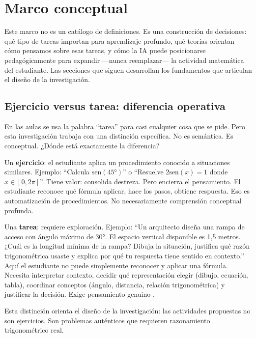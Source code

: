 \section{Marco conceptual}

Este marco no es un catálogo de definiciones. Es una construcción de decisiones: qué tipo de tareas importan para aprendizaje profundo, qué teorías orientan cómo pensamos sobre esas tareas, y cómo la IA puede posicionarse pedagógicamente para expandir —nunca reemplazar— la actividad matemática del estudiante. Las secciones que siguen desarrollan los fundamentos que articulan el diseño de la investigación.

\subsection{Ejercicio versus tarea: diferencia operativa}

En las aulas se usa la palabra ``tarea'' para casi cualquier cosa que se pide. Pero esta investigación trabaja con una distinción específica. No es semántica. Es conceptual. ¿Dónde está exactamente la diferencia?

Un \textbf{ejercicio}: el estudiante aplica un procedimiento conocido a situaciones similares. Ejemplo: ``Calcula $\mathrm{sen}(45°)$'' o ``Resuelve $2\mathrm{sen}(x) = 1$ donde $x \in [0, 2\pi]$''. Tiene valor: consolida destreza. Pero encierra el pensamiento. El estudiante reconoce qué fórmula aplicar, hace los pasos, obtiene respuesta. Eso es automatización de procedimientos. No necesariamente comprensión conceptual profunda.

Una \textbf{tarea}: requiere exploración. Ejemplo: ``Un arquitecto diseña una rampa de acceso con ángulo máximo de $30°$. El espacio vertical disponible es 1{,}5 metros. ¿Cuál es la longitud mínima de la rampa? Dibuja la situación, justifica qué razón trigonométrica usaste y explica por qué tu respuesta tiene sentido en contexto.'' Aquí el estudiante no puede simplemente reconocer y aplicar una fórmula. Necesita interpretar contexto, decidir qué representación elegir (dibujo, ecuación, tabla), coordinar conceptos (ángulo, distancia, relación trigonométrica) y justificar la decisión. Exige pensamiento genuino \parencite{leungDesigningMathematicsTasks2015, radmehrTheoreticalFrameworkTask2023, canogullariTaskDesignPrinciples2025}.

Esta distinción orienta el diseño de la investigación: las actividades propuestas no son ejercicios. Son problemas auténticos que requieren razonamiento trigonométrico real.

